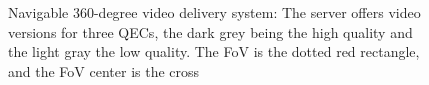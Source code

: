 \begin{figure}[h]
\caption{Navigable 360-degree video delivery system: The server
offers video versions for three \acp{QEC}, the dark grey being the high quality and the light
gray the low quality. The \ac{FoV}  is the dotted red rectangle, and the \ac{FoV} center is the
cross}
\label{fig:deliverychain}
\end{figure}
